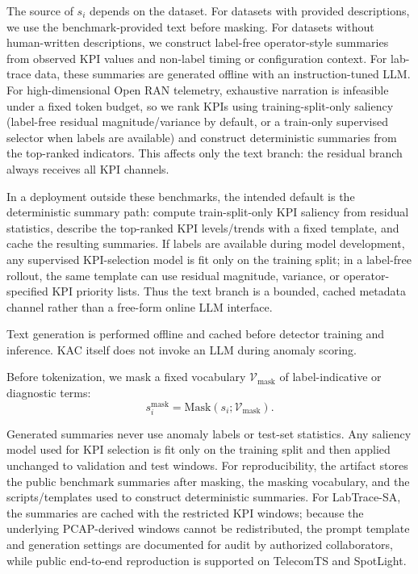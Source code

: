\documentclass[conference]{IEEEtran}
\begin{document}
The source of $s_i$ depends on the dataset.
For datasets with provided descriptions, we use the benchmark-provided text before masking.
For datasets without human-written descriptions, we construct label-free operator-style summaries from observed KPI values and non-label timing or configuration context.
For lab-trace data, these summaries are generated offline with an instruction-tuned LLM.
For high-dimensional Open RAN telemetry, exhaustive narration is infeasible under a fixed token budget, so we rank KPIs using training-split-only saliency (label-free residual magnitude/variance by default, or a train-only supervised selector when labels are available) and construct deterministic summaries from the top-ranked indicators.
This affects only the text branch: the residual branch always receives all KPI channels.

In a deployment outside these benchmarks, the intended default is the deterministic summary path: compute train-split-only KPI saliency from residual statistics, describe the top-ranked KPI levels/trends with a fixed template, and cache the resulting summaries. If labels are available during model development, any supervised KPI-selection model is fit only on the training split; in a label-free rollout, the same template can use residual magnitude, variance, or operator-specified KPI priority lists. Thus the text branch is a bounded, cached metadata channel rather than a free-form online LLM interface.

Text generation is performed offline and cached before detector training and inference.
KAC itself does not invoke an LLM during anomaly scoring.

Before tokenization, we mask a fixed vocabulary $\mathcal{V}_{\mathrm{mask}}$ of label-indicative or diagnostic terms:
\begin{equation}
    s_i^{\mathrm{mask}}
    =
    \mathrm{Mask}(s_i; \mathcal{V}_{\mathrm{mask}}).
\end{equation}

Generated summaries never use anomaly labels or test-set statistics.
Any saliency model used for KPI selection is fit only on the training split and then applied unchanged to validation and test windows.
For reproducibility, the artifact stores the public benchmark summaries after masking, the masking vocabulary, and the scripts/templates used to construct deterministic summaries. For LabTrace-SA, the summaries are cached with the restricted KPI windows; because the underlying PCAP-derived windows cannot be redistributed, the prompt template and generation settings are documented for audit by authorized collaborators, while public end-to-end reproduction is supported on TelecomTS and SpotLight.
\end{document}
